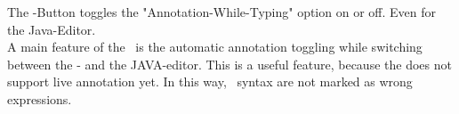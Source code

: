 The -Button toggles the "Annotation-While-Typing" option on or off. Even for the Java-Editor.\\
A main feature of the \cjdt ~is the automatic annotation toggling while switching between the \caesarj - and the JAVA-editor. This is a useful feature, because the \cjdt does not support live annotation yet. In this way, \caesarj ~syntax are not marked as wrong expressions.


